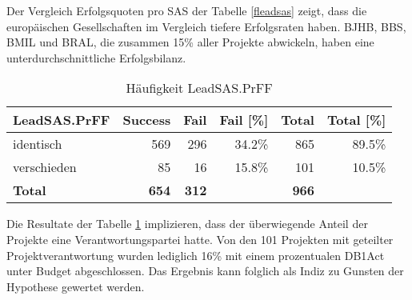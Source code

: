 Der Vergleich Erfolgsquoten pro SAS der Tabelle \ref{fleadsas} zeigt, dass die europäischen Gesellschaften im Vergleich tiefere Erfolgsraten haben. BJHB, BBS, BMIL und BRAL, die zusammen 15\% aller Projekte abwickeln, haben eine unterdurchschnittliche Erfolgsbilanz.
\begin{table}[H]
	\centering
	\caption{Häufigkeit LeadSAS.PrFF}
	\begin{tabular}{lrrrrr}
		\textbf{LeadSAS.PrFF} & \multicolumn{1}{l}{\textbf{Success}} & \multicolumn{1}{l}{\textbf{Fail}} & \multicolumn{1}{l}{\textbf{Fail [\%]}} & \multicolumn{1}{l}{\textbf{Total}} & \multicolumn{1}{l}{\textbf{Total [\%]}}
		\\\hline
		identisch    & 569   & 296   & 34.2\% & 865 & 89.5\% \\
		verschieden   & 85    & 16    & 15.8\% & 101 & 10.5\% \\\hline
		\textbf{Total} & \textbf{654} & \textbf{312} &       & \textbf{966} \\
	\end{tabular}%
	\label{fleadsasprff}%
\end{table}%
Die Resultate der Tabelle \ref{fleadsasprff} implizieren, dass der überwiegende Anteil der Projekte eine Verantwortungspartei hatte. Von den 101 Projekten mit geteilter Projektverantwortung wurden lediglich 16\% mit einem prozentualen DB1Act unter Budget abgeschlossen. Das Ergebnis kann folglich als Indiz zu Gunsten der Hypothese gewertet werden.
